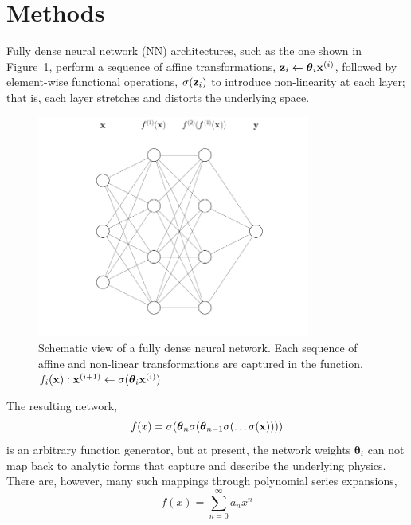 \section{Methods}\label{methods}

Fully dense neural network (NN) architectures, such as the one shown in Figure~\ref{fig:nn-1}, perform a sequence of affine transformations, ${\bold z}_i \leftarrow \boldsymbol\theta_i {\bold x}^{(i)}$, followed by element-wise functional operations, $\sigma({\bold z}_i)$ to introduce non-linearity at each layer; that is, each layer stretches and distorts the underlying space.
\begin{figure}[htbp]
\begin{center}
\includegraphics[width=0.8\textwidth]{fig/neural-network-01}
\caption{Schematic view of a fully dense neural network. Each sequence of affine and non-linear transformations are captured in the function, $f_i({\bold x}): {\bold x}^{(i+1)} \leftarrow \sigma(\boldsymbol\theta_i {\bold x}^{(i)})$}
\label{fig:nn-1}
\end{center}
\end{figure}

The resulting network,
\begin{equation}
	f(x) = \sigma(\boldsymbol\theta_n \sigma(\boldsymbol\theta_{n-1} \sigma(\ldots \sigma({\bold x}))))
	\label{eqn:nn analytical form}
\end{equation}
is an arbitrary function generator, but at present, the network weights $\boldsymbol\theta_i$ can not map back to analytic forms that capture and describe the underlying physics. There are, however, many such mappings through polynomial series expansions,
\begin{equation}
	f(x) = \sum_{n=0}^\infty a_n x^n
\end{equation}

